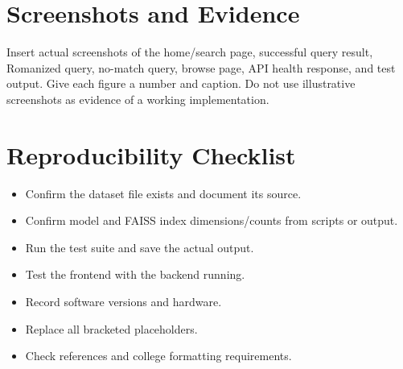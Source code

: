 \documentclass[12pt,a4paper]{report}
\begin{document}
\appendix
\chapter{Screenshots and Evidence}
Insert actual screenshots of the home/search page, successful query result,
Romanized query, no-match query, browse page, API health response, and test
output. Give each figure a number and caption. Do not use illustrative screenshots
as evidence of a working implementation.

\chapter{Reproducibility Checklist}
\begin{itemize}
    \item Confirm the dataset file exists and document its source.
    \item Confirm model and FAISS index dimensions/counts from scripts or output.
    \item Run the test suite and save the actual output.
    \item Test the frontend with the backend running.
    \item Record software versions and hardware.
    \item Replace all bracketed placeholders.
    \item Check references and college formatting requirements.
\end{itemize}
\end{document}
